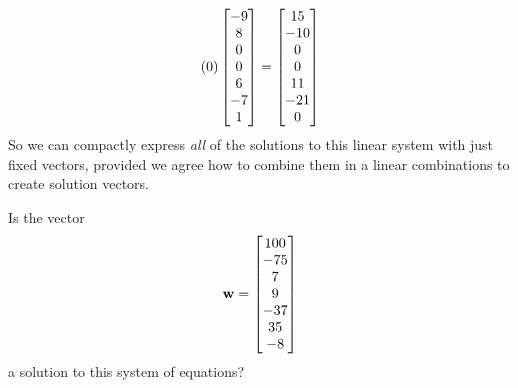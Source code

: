 \documentclass{ximera}
\begin{document}
\begin{example}
\begin{align*}
    (0)\begin{bmatrix}-9\\ 8\\ 0\\ 0\\ 6\\ -7\\ 1\end{bmatrix}
    =
    \begin{bmatrix}15\\ -10\\ 0\\ 0\\ 11\\ -21\\ 0\end{bmatrix}
  \end{align*}
  So we can compactly express \textit{all} of the solutions to this
  linear system with just  fixed vectors, provided we agree
  how to combine them in a linear combinations to create solution
  vectors.

  \begin{question}
    Is the vector 
    \[
      \mathbf{w}=\begin{bmatrix}100\\-75\\7\\9\\-37\\35\\-8\end{bmatrix}
    \]
    a solution to this system of equations?

    \begin{multipleChoice}
    \end{multipleChoice}


\end{question}
\end{example}
\end{document}
